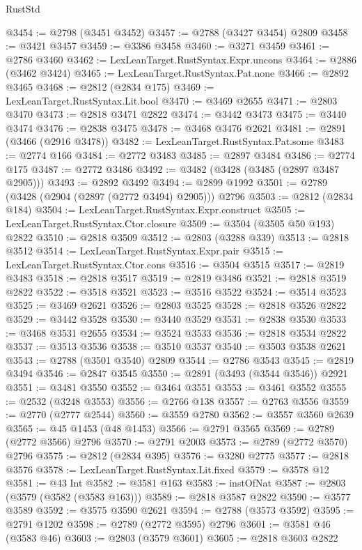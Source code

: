 \begin{lexlean}{RustStd}
\begin{coremodule}
@3454 := @2798 (@3451 @3452)
@3457 := @2788 (@3427 @3454) @2809
@3458 := @3421 @3457
@3459 := @3386 @3458
@3460 := @3271 @3459
@3461 := @2786 @3460
@3462 := LexLeanTarget.RustSyntax.Expr.uncons
@3464 := @2886 (@3462 @3424)
@3465 := LexLeanTarget.RustSyntax.Pat.none
@3466 := @2892 @3465
@3468 := @2812 (@2834 @175)
@3469 := LexLeanTarget.RustSyntax.Lit.bool
@3470 := @3469 @2655
@3471 := @2803 @3470
@3473 := @2818 @3471 @2822
@3474 := @3442 @3473
@3475 := @3440 @3474
@3476 := @2838 @3475
@3478 := @3468 @3476 @2621
@3481 := @2891 (@3466 (@2916 @3478))
@3482 := LexLeanTarget.RustSyntax.Pat.some
@3483 := @2774 @166
@3484 := @2772 @3483
@3485 := @2897 @3484
@3486 := @2774 @175
@3487 := @2772 @3486
@3492 := @3482 (@3428 (@3485 (@2897 @3487 @2905)))
@3493 := @2892 @3492
@3494 := @2899 @1992
@3501 := @2789 (@3428 (@2904 (@2897 (@2772 @3494) @2905))) @2796
@3503 := @2812 (@2834 @184)
@3504 := LexLeanTarget.RustSyntax.Expr.construct
@3505 := LexLeanTarget.RustSyntax.Ctor.closure
@3509 := @3504 (@3505 @50 @193) @2822
@3510 := @2818 @3509
@3512 := @2803 (@3288 @339)
@3513 := @2818 @3512
@3514 := LexLeanTarget.RustSyntax.Expr.pair
@3515 := LexLeanTarget.RustSyntax.Ctor.cons
@3516 := @3504 @3515
@3517 := @2819 @3483
@3518 := @2818 @3517
@3519 := @2819 @3486
@3521 := @2818 @3519 @2822
@3522 := @3518 @3521
@3523 := @3516 @3522
@3524 := @3514 @3523
@3525 := @3469 @2621
@3526 := @2803 @3525
@3528 := @2818 @3526 @2822
@3529 := @3442 @3528
@3530 := @3440 @3529
@3531 := @2838 @3530
@3533 := @3468 @3531 @2655
@3534 := @3524 @3533
@3536 := @2818 @3534 @2822
@3537 := @3513 @3536
@3538 := @3510 @3537
@3540 := @3503 @3538 @2621
@3543 := @2788 (@3501 @3540) @2809
@3544 := @2786 @3543
@3545 := @2819 @3494
@3546 := @2847 @3545
@3550 := @2891 (@3493 (@3544 @3546)) @2921
@3551 := @3481 @3550
@3552 := @3464 @3551
@3553 := @3461 @3552
@3555 := @2532 (@3248 @3553)
@3556 := @2766 @138
@3557 := @2763 @3556
@3559 := @2770 (@2777 @2544)
@3560 := @3559 @2780
@3562 := @3557 @3560 @2639
@3565 := @45 @1453 (@48 @1453)
@3566 := @2791 @3565
@3569 := @2789 (@2772 @3566) @2796
@3570 := @2791 @2003
@3573 := @2789 (@2772 @3570) @2796
@3575 := @2812 (@2834 @395)
@3576 := @3280 @2775
@3577 := @2818 @3576
@3578 := LexLeanTarget.RustSyntax.Lit.fixed
@3579 := @3578 @12
@3581 := @43 Int
@3582 := @3581 @163
@3583 := instOfNat
@3587 := @2803 (@3579 (@3582 (@3583 @163)))
@3589 := @2818 @3587 @2822
@3590 := @3577 @3589
@3592 := @3575 @3590 @2621
@3594 := @2788 (@3573 @3592)
@3595 := @2791 @1202
@3598 := @2789 (@2772 @3595) @2796
@3601 := @3581 @46 (@3583 @46)
@3603 := @2803 (@3579 @3601)
@3605 := @2818 @3603 @2822

\end{coremodule}
\end{lexlean}
